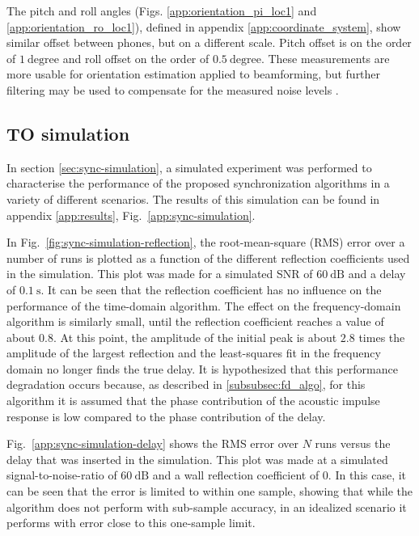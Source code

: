 \documentclass[a4paper, notitlepage]{report}
\begin{document}
The pitch and roll angles (Figs. \ref{app:orientation_pi_loc1} and \ref{app:orientation_ro_loc1}), defined in appendix \ref{app:coordinate_system}, show similar offset between phones, but on a different scale. Pitch offset is on the order of $1~\mathrm{degree}$ and roll offset on the order of $0.5~\mathrm{degree}$. These measurements are more usable for orientation estimation applied to beamforming, but further filtering may be used to compensate for the measured noise levels \cite{goslinski2015}.

\subsection{TO simulation}
\label{sec:disc_to}
In section \ref{sec:sync-simulation}, a simulated experiment was performed to characterise the performance of the proposed synchronization algorithms in a variety of different scenarios. The results of this simulation can be found in appendix \ref{app:results}, Fig.~\ref{app:sync-simulation}.

In Fig.~\ref{fig:sync-simulation-reflection}, the root-mean-square (RMS) error over a number of runs is plotted as a function of the different reflection coefficients used in the simulation. This plot was made for a simulated SNR of $60~\mathrm{dB}$ and a delay of $0.1~\mathrm{s}$. It can be seen that the reflection coefficient has no influence on the performance of the time-domain algorithm. The effect on the frequency-domain algorithm is similarly small, until the reflection coefficient reaches a value of about $0.8$. At this point, the amplitude of the initial peak is about $2.8$ times the amplitude of the largest reflection and the least-squares fit in the frequency domain no longer finds the true delay. It is hypothesized that this performance degradation occurs because, as described in \ref{subsubsec:fd_algo}, for this algorithm it is assumed that the phase contribution of the acoustic impulse response is low compared to the phase contribution of the delay.

Fig.~\ref{app:sync-simulation-delay} shows the RMS error over $N$ runs versus the delay that was inserted in the simulation. This plot was made at a simulated signal-to-noise-ratio of $60~\mathrm{dB}$ and a wall reflection coefficient of 0. In this case, it can be seen that the error is limited to within one sample, showing that while the algorithm does not perform with sub-sample accuracy, in an idealized scenario it performs with error close to this one-sample limit.
\end{document}
